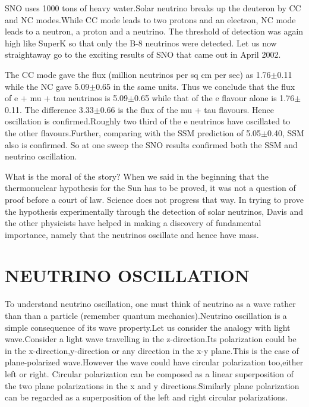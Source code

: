SNO uses 1000 tons of heavy water.Solar neutrino breaks up the
deuteron by CC and NC modes.While CC mode leads to two protons
and an electron, NC mode leads to a neutron, a proton and a neutrino.
The threshold of detection was again high like SuperK so that 
only the B-8 neutrinos were detected.
Let us now straightaway go to the exciting results
of SNO that came out in April 2002.

The CC mode gave the flux (million neutrinos per sq cm per sec)
as 1.76$\pm$0.11 while the NC gave 5.09$\pm$0.65 in the same units.
Thus we conclude that the flux of e + mu + tau neutrinos is
5.09$\pm$0.65 while that of the e flavour alone is 1.76$\pm$0.11.
The difference 3.33$\pm$0.66 is the flux of the mu + tau flavours.
Hence oscillation is confirmed.Roughly two third of the e
neutrinos have oscillated to the other flavours.Further,
comparing with the SSM prediction of 5.05$\pm$0.40, SSM also
is confirmed. So at one sweep the SNO results
confirmed both the SSM and neutrino oscillation.

What is the moral of the story? When we said in the beginning
that the thermonuclear hypothesis for the Sun has to be proved,
it was not a question of proof before a court of law. Science
does not progress that way. In trying to prove the hypothesis
experimentally through the detection of solar neutrinos, Davis
and the other physicists have helped in making a discovery of
fundamental importance, namely that the neutrinos oscillate
and hence have mass.

\section{NEUTRINO OSCILLATION}

To understand neutrino oscillation, one must think
of neutrino as a wave rather than than a particle
(remember quantum mechanics).Neutrino oscillation
is a simple consequence of its wave property.Let
us consider the analogy with light wave.Consider a
light wave travelling in the z-direction.Its 
polarization could be in the x-direction,y-direction
or any direction in the x-y plane.This is the case
of plane-polarized wave.However the wave could have
circular polarization too,either left or right.
Circular polarization can be composed as a linear
superposition of the two plane polarizations in the
x and y directions.Similarly plane polarization can
be regarded as a superposition of the left and right
circular polarizations.

